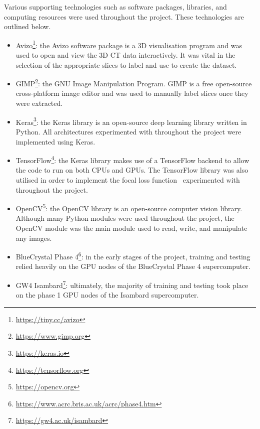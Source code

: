 Various supporting technologies such as software packages, libraries, and computing resources were used throughout the project. These technologies are outlined below.

\vspace{0.5cm} 

\begin{itemize}
\item Avizo\footnote{\url{https://tiny.cc/avizo}}: the Avizo software package is a 3D visualisation program and was used to open and view the 3D CT data interactively. It was vital in the selection of the appropriate slices to label and use to create the dataset.
\item GIMP\footnote{\url{https://www.gimp.org}}: the GNU Image Manipulation Program. GIMP is a free open-source cross-platform image editor and was used to manually label slices once they were extracted.
\item Keras\footnote{\url{https://keras.io}}: the Keras library is an open-source deep learning library written in Python. All architectures experimented with throughout the project were implemented using Keras.
\item TensorFlow\footnote{\url{https://tensorflow.org}}: the Keras library makes use of a TensorFlow backend to allow the code to run on both CPUs and GPUs. The TensorFlow library was also utilised in order to implement the focal loss function~\cite{focalloss} experimented with throughout the project.
\item OpenCV\footnote{\url{https://opencv.org}}: the OpenCV library is an open-source computer vision library. Although many Python modules were used throughout the project, the OpenCV module was the main module used to read, write, and manipulate any images.
\item BlueCrystal Phase 4\footnote{\url{https://www.acrc.bris.ac.uk/acrc/phase4.htm}}: in the early stages of the project, training and testing relied heavily on the GPU nodes of the BlueCrystal Phase 4 supercomputer.
\item GW4 Isambard\footnote{\url{https://gw4.ac.uk/isambard}}: ultimately, the majority of training and testing took place on the phase 1 GPU nodes of the Isambard supercomputer.
\end{itemize}